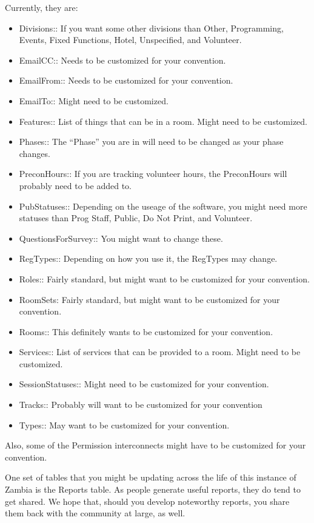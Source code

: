\documentclass[tablesignature]{scrartcl}
\begin{document}
  Currently, they are:
\begin{itemize}
\item Divisions:: If you want some other divisions than Other,
    Programming, Events, Fixed Functions, Hotel, Unspecified, and
    Volunteer.
\item EmailCC:: Needs to be customized for your convention.
\item EmailFrom:: Needs to be customized for your convention.
\item EmailTo:: Might need to be customized.
\item Features:: List of things that can be in a room.  Might need to be
    customized.
\item Phases:: The ``Phase'' you are in will need to be changed as your
    phase changes.
\item PreconHours:: If you are tracking volunteer hours, the PreconHours
    will probably need to be added to.
\item PubStatuses:: Depending on the useage of the software, you might
    need more statuses than Prog Staff, Public, Do Not Print, and
    Volunteer.
\item QuestionsForSurvey:: You might want to change these.
\item RegTypes:: Depending on how you use it, the RegTypes may change.
\item Roles:: Fairly standard, but might want to be customized for your
    convention.
\item RoomSets: Fairly standard, but might want to be customized for
    your convention.
\item Rooms:: This definitely wants to be customized for your
    convention.
\item Services:: List of services that can be provided to a room.  Might
    need to be customized.
\item SessionStatuses:: Might need to be customized for your
    convention.
\item Tracks:: Probably will want to be customized for your convention
\item Types:: May want to be customized for your convention.
\end{itemize}

  Also, some of the Permission interconnects might have to be
  customized for your convention.

  One set of tables that you might be updating across the life of this
  instance of Zambia is the Reports table.  As people generate useful
  reports, they do tend to get shared.  We hope that, should you
  develop noteworthy reports, you share them back with the community
  at large, as well.
\end{document}
